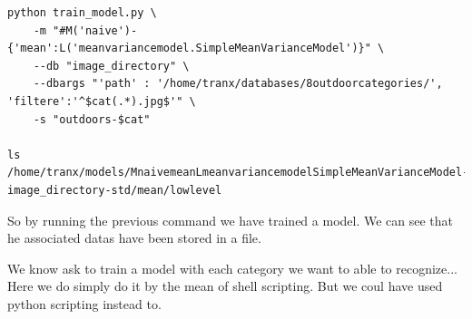 \documentclass{report}
\begin{document}
\begin{lstlisting}
python train_model.py \
    -m "#M('naive')-{'mean':L('meanvariancemodel.SimpleMeanVarianceModel')}" \
    --db "image_directory" \
    --dbargs "'path' : '/home/tranx/databases/8outdoorcategories/', 'filtere':'^$cat(.*).jpg$'" \
    -s "outdoors-$cat" 

ls /home/tranx/models/MnaivemeanLmeanvariancemodelSimpleMeanVarianceModel-image_directory-std/mean/lowlevel

\end{lstlisting}






So by running the previous command we have trained a model.
We can see that he associated datas have been stored in a file.


We know ask to train a model with each category we want to able to recognize...
Here we do simply do it by the mean of shell scripting. But we coul have used python
scripting instead to.
\end{document}
